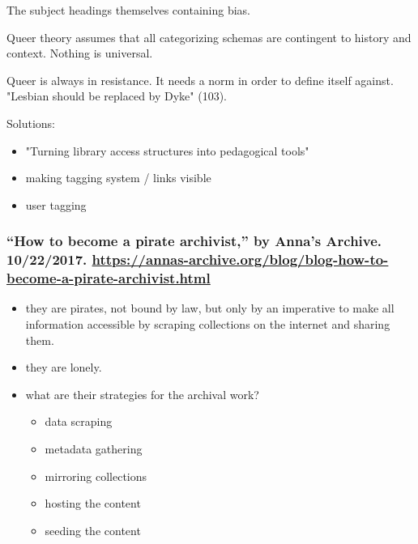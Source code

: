 \documentclass[11pt]{article}
\begin{document}
The subject headings themselves containing bias.

Queer theory assumes that all categorizing schemas are contingent to
history and context. Nothing is universal.

Queer is always in resistance. It needs a norm in order to define
itself against. "Lesbian should be replaced by Dyke" (103).

Solutions:
\begin{itemize}
\item "Turning library access structures into pedagogical tools"
\item making tagging system / links visible
\item user tagging
\end{itemize}

\subsubsection{“How to become a pirate archivist,” by Anna’s Archive. 10/22/2017. \url{https://annas-archive.org/blog/blog-how-to-become-a-pirate-archivist.html}}
\label{sec:orgc44d5e3}
\begin{itemize}
\item they are pirates, not bound by law, but only by an imperative to
make all information accessible by scraping collections on the
internet and sharing them.
\item they are lonely.
\item what are their strategies for the archival work?
\begin{itemize}
\item data scraping
\item metadata gathering
\item mirroring collections
\item hosting the content
\item seeding the content
\end{itemize}
\end{itemize}
\end{document}
